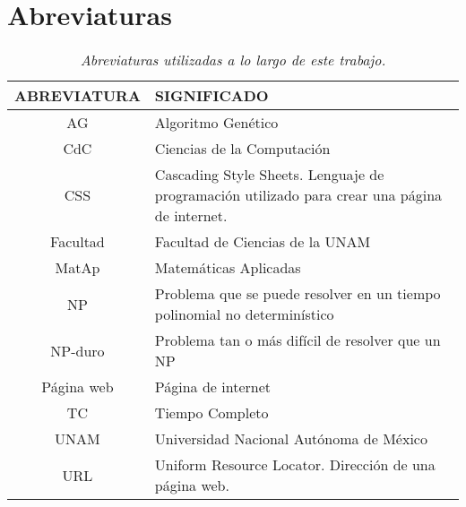 \section{Abreviaturas}

\begin{table}[H]
\centering
\begin{tabular}{|c|p{10cm}|}
\hline 
 \textbf{ABREVIATURA} & \textbf{SIGNIFICADO} \\ 
\hline 
 AG & Algoritmo Genético \\ 
\hline 
 CdC & Ciencias de la Computación \\ 
\hline 
 CSS & Cascading Style Sheets. Lenguaje de programación utilizado para crear una página de internet. \\ 
\hline 
 Facultad & Facultad de Ciencias de la UNAM \\ 
\hline 
 MatAp & Matemáticas Aplicadas \\ 
\hline 
 NP & Problema que se puede resolver en un tiempo polinomial no determinístico \\ %
\hline 
 NP-duro & Problema tan o más difícil de resolver que un NP \\ %
 \hline 
 Página web & Página de internet \\ 
\hline 
 TC & Tiempo Completo \\ 
\hline 
 UNAM & Universidad Nacional Autónoma de México \\ 
\hline 
 URL & Uniform Resource Locator. Dirección de una página web. \\
\hline 
\end{tabular} 
\caption[\textit{Abreviaturas}]{\textit{Abreviaturas utilizadas a lo largo de este trabajo.}}
\end{table}

